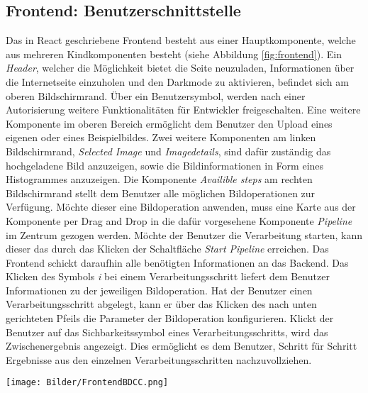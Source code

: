 \subsection{Frontend: Benutzerschnittstelle}
Das in React geschriebene Frontend besteht aus einer Hauptkomponente, welche aus mehreren Kindkomponenten besteht (siehe Abbildung \ref{fig:frontend}).
Ein \textit{Header}, welcher die Möglichkeit bietet die Seite neuzuladen, Informationen über die Internetseite einzuholen und den Darkmode zu aktivieren, befindet sich am oberen Bildschirmrand.
Über ein Benutzersymbol, werden nach einer Autorisierung weitere Funktionalitäten für Entwickler freigeschalten.
Eine weitere Komponente im oberen Bereich ermöglicht dem Benutzer den Upload eines eigenen oder eines Beispielbildes.
Zwei weitere Komponenten am linken Bildschirmrand, \textit{Selected Image} und \textit{Imagedetails}, sind dafür zuständig das hochgeladene Bild anzuzeigen, sowie die Bildinformationen in Form eines Histogrammes anzuzeigen.
Die Komponente \textit{Availible steps} am rechten Bildschirmrand stellt dem Benutzer alle möglichen Bildoperationen zur Verfügung.
Möchte dieser eine Bildoperation anwenden, muss eine Karte aus der Komponente per Drag and Drop in die dafür vorgesehene Komponente \textit{Pipeline} im Zentrum gezogen werden.
Möchte der Benutzer die Verarbeitung starten, kann dieser das durch das Klicken der Schaltfläche \textit{Start Pipeline} erreichen.
Das Frontend schickt daraufhin alle benötigten Informationen an das Backend.
Das Klicken des Symbols \textit{i} bei einem Verarbeitungsschritt liefert dem Benutzer Informationen zu der jeweiligen Bildoperation.
Hat der Benutzer einen Verarbeitungsschritt abgelegt, kann er über das Klicken des nach unten gerichteten Pfeils die Parameter der Bildoperation konfigurieren.
Klickt der Benutzer auf das Sichbarkeitssymbol eines Verarbeitungsschritts, wird das Zwischenergebnis angezeigt.
Dies ermöglicht es dem Benutzer, Schritt für Schritt Ergebnisse aus den einzelnen Verarbeitungsschritten nachzuvollziehen.
\begin{figure*}[ht]
    \centering
    \texttt{[image: Bilder/FrontendBDCC.png]}
    \caption{Übersicht der Komponenten im Frontend}
    \label{fig:frontend}
\end{figure*}